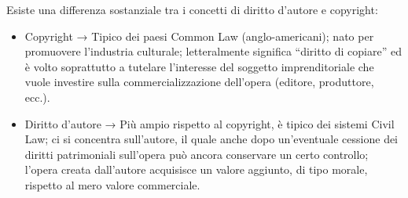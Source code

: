 Esiste una differenza sostanziale tra i concetti di diritto d’autore e copyright:
\begin{itemize}
    \item Copyright → Tipico dei paesi Common Law (anglo-americani); nato per promuovere l’industria culturale; letteralmente significa “diritto di copiare” ed è volto soprattutto a tutelare l’interesse del soggetto imprenditoriale che vuole investire sulla commercializzazione dell’opera (editore, produttore, ecc.).
    \item  Diritto d’autore → Più ampio rispetto al copyright, è tipico dei sistemi Civil Law; ci si concentra sull’autore, il quale anche dopo un’eventuale cessione dei diritti patrimoniali sull’opera può ancora conservare un certo controllo; l’opera creata dall’autore acquisisce un valore aggiunto, di tipo morale, rispetto al mero valore commerciale.
\end{itemize}